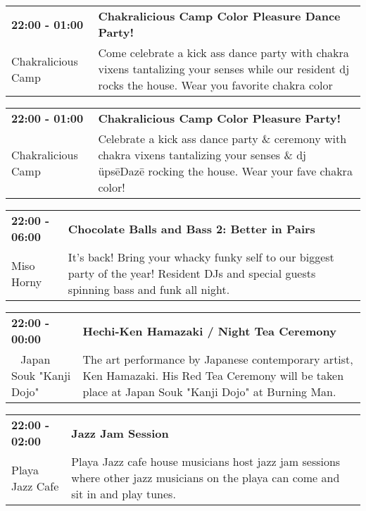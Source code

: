 \begin{tabular}{ p{1in} p{2.2in} }
    \textbf{22:00 - 01:00} & \textbf{Chakralicious Camp Color Pleasure Dance Party!} \\
    Chakralicious Camp \newline  & Come celebrate a kick ass dance party with chakra vixens tantalizing your senses while our resident dj rocks the house. Wear you favorite chakra color \\
    \hline 
\end{tabular}
    
\begin{tabular}{ p{1in} p{2.2in} }
    \textbf{22:00 - 01:00} & \textbf{Chakralicious Camp Color Pleasure Party!} \\
    Chakralicious Camp \newline  & Celebrate a kick ass dance party \& ceremony with chakra vixens tantalizing your senses \& dj \"ups\=eDaz\=e rocking the house. Wear your fave chakra color! \\
    \hline 
\end{tabular}
    
\begin{tabular}{ p{1in} p{2.2in} }
    \textbf{22:00 - 06:00} & \textbf{Chocolate Balls and Bass 2: Better in Pairs} \\
    Miso Horny \newline  & It's back! Bring your whacky funky self to our biggest party of the year! Resident DJs and special guests spinning bass and funk all night. \\
    \hline 
\end{tabular}
    
\begin{tabular}{ p{1in} p{2.2in} }
    \textbf{22:00 - 00:00} & \textbf{Hechi-Ken Hamazaki / Night Tea Ceremony} \\
    ~ \newline Japan Souk "Kanji Dojo" & The art performance by Japanese contemporary artist, Ken Hamazaki. His Red Tea Ceremony will be taken place at Japan Souk "Kanji Dojo" at Burning Man. \\
    \hline 
\end{tabular}
    
\begin{tabular}{ p{1in} p{2.2in} }
    \textbf{22:00 - 02:00} & \textbf{Jazz Jam Session} \\
    Playa Jazz Cafe \newline  & Playa Jazz cafe house musicians host jazz jam sessions where other jazz musicians on the playa can come and sit in and play tunes. \\
    \hline 
\end{tabular}
    
